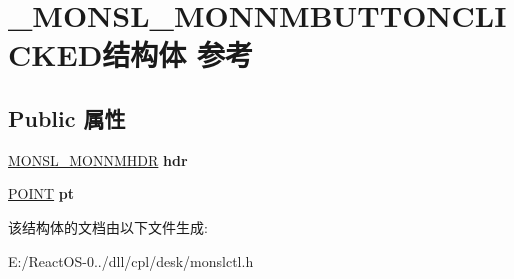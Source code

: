 \hypertarget{struct___m_o_n_s_l___m_o_n_n_m_b_u_t_t_o_n_c_l_i_c_k_e_d}{}\section{\+\_\+\+M\+O\+N\+S\+L\+\_\+\+M\+O\+N\+N\+M\+B\+U\+T\+T\+O\+N\+C\+L\+I\+C\+K\+E\+D结构体 参考}
\label{struct___m_o_n_s_l___m_o_n_n_m_b_u_t_t_o_n_c_l_i_c_k_e_d}
\subsection*{Public 属性}
\begin{DoxyCompactItemize}
\item 
\mbox{\label{struct___m_o_n_s_l___m_o_n_n_m_b_u_t_t_o_n_c_l_i_c_k_e_d_aed58118b3238741feea48206b2876137}} 
\hyperlink{struct___m_o_n_s_l___m_o_n_n_m_h_d_r}{M\+O\+N\+S\+L\+\_\+\+M\+O\+N\+N\+M\+H\+DR} {\bfseries hdr}
\item 
\mbox{\label{struct___m_o_n_s_l___m_o_n_n_m_b_u_t_t_o_n_c_l_i_c_k_e_d_ac86e5fb8fe98278eb48a25e315fd6dfb}} 
\hyperlink{structtag_p_o_i_n_t}{P\+O\+I\+NT} {\bfseries pt}
\end{DoxyCompactItemize}


该结构体的文档由以下文件生成\+:\begin{DoxyCompactItemize}
\item 
E\+:/\+React\+O\+S-\/0../dll/cpl/desk/monslctl.\+h\end{DoxyCompactItemize}

